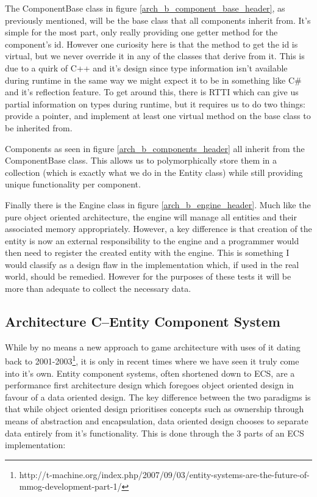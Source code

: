 \documentclass{article}
\begin{document}
The ComponentBase class in figure \ref{arch_b_component_base_header}, as
previously mentioned, will be the base class that all components inherit from.
It's simple for the most part, only really providing one getter method for the
component's id. However one curiosity here is that the method to get the id is
virtual, but we never override it in any of the classes that derive from it.
This is due to a quirk of C++ and it's design since type information isn't
available during runtime in the same way we might expect it to be in something
like C\# and it's reflection feature. To get around this, there is RTTI which
can give us partial information on types during runtime, but it requires us to
do two things: provide a pointer, and implement at least one virtual method on
the base class to be inherited from.

Components as seen in figure \ref{arch_b_components_header} all inherit from the
ComponentBase class. This allows us to polymorphically store them in a
collection (which is exactly what we do in the Entity class) while still
providing unique functionality per component.

Finally there is the Engine class in figure \ref{arch_b_engine_header}. Much
like the pure object oriented architecture, the engine will manage all entities
and their associated memory appropriately. However, a key difference is that
creation of the entity is now an external responsibility to the engine and a
programmer would then need to register the created entity with the engine. This
is something I would classify as a design flaw in the implementation which, if
used in the real world, should be remedied. However for the purposes of these
tests it will be more than adequate to collect the necessary data.

\subsection{Architecture C--Entity Component System}
While by no means a new approach to game architecture with uses of it dating
back to 2001-2003\footnote{http://t-machine.org/index.php/2007/09/03/entity-systems-are-the-future-of-mmog-development-part-1/},
it is only in recent times where we have seen it truly come into it's own.
Entity component systems, often shortened down to ECS, are a performance first
architecture design which foregoes object oriented design in favour of a data
oriented design. The key difference between the two paradigms is that while
object oriented design prioritises concepts such as ownership through means of
abstraction and encapsulation, data oriented design chooses to separate data
entirely from it's functionality. This is done through the 3 parts of an ECS
implementation:
\end{document}
